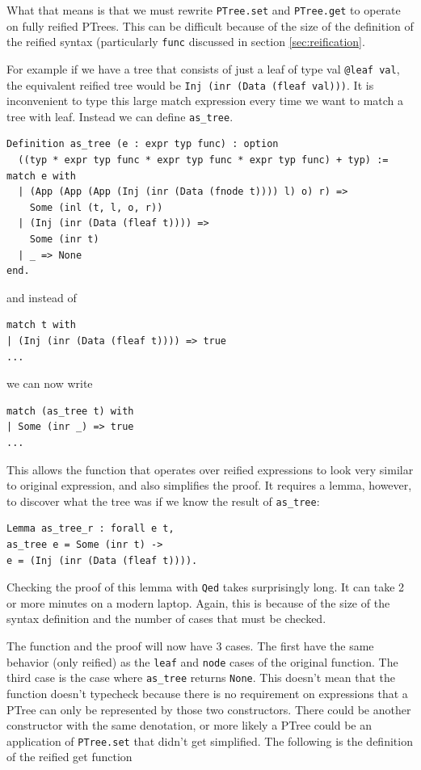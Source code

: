 \documentclass{puthesis}
\begin{document}
What that means is that we must rewrite \lstinline|PTree.set| and
\lstinline|PTree.get| to operate on fully reified PTrees. This can be
difficult because of the size of the definition of the reified syntax
(particularly \lstinline|func| discussed in section
\ref{sec:reification}. 

For example if we have a tree that consists of just a leaf of type val
\lstinline|@leaf val|, the equivalent reified tree would be
\lstinline|Inj (inr (Data (fleaf val)))|. It is inconvenient to type
this large match expression every time we want to match a tree with
leaf. Instead we can define \lstinline|as_tree|.



\begin{lstlisting}
Definition as_tree (e : expr typ func) : option
  ((typ * expr typ func * expr typ func * expr typ func) + typ) := 
match e with
  | (App (App (App (Inj (inr (Data (fnode t)))) l) o) r) =>
    Some (inl (t, l, o, r))
  | (Inj (inr (Data (fleaf t)))) =>
    Some (inr t)
  | _ => None
end.
\end{lstlisting}

and instead of 

\begin{lstlisting}
match t with
| (Inj (inr (Data (fleaf t)))) => true
...
\end{lstlisting}

we can now write

\begin{lstlisting}
match (as_tree t) with
| Some (inr _) => true
...
\end{lstlisting}

This allows the function that operates over reified expressions to look very
similar to original expression, and also simplifies the proof. It
requires a lemma, however, to discover what the tree was if we know
the result of \lstinline|as_tree|:

\begin{lstlisting}
Lemma as_tree_r : forall e t,
as_tree e = Some (inr t) ->
e = (Inj (inr (Data (fleaf t)))).
\end{lstlisting}

Checking the proof of this lemma with \lstinline|Qed| takes
surprisingly long. It can take 2 or more minutes on a modern
laptop. Again, this is because of the size of the syntax definition
and the number of cases that must be checked.

The function
and the proof will now have 3 cases. The first have the same behavior (only reified)
as the \lstinline|leaf| and \lstinline|node| cases of the original function. The third
case is the case where \lstinline|as_tree| returns \lstinline|None|. This doesn't
mean that the function doesn't typecheck because there is no requirement on 
expressions that a PTree can only be represented by those two constructors. There
could be another constructor with the same denotation, or more likely a PTree
could be an application of \lstinline|PTree.set| that didn't get
simplified. The following is the definition of the reified get function
\end{document}
